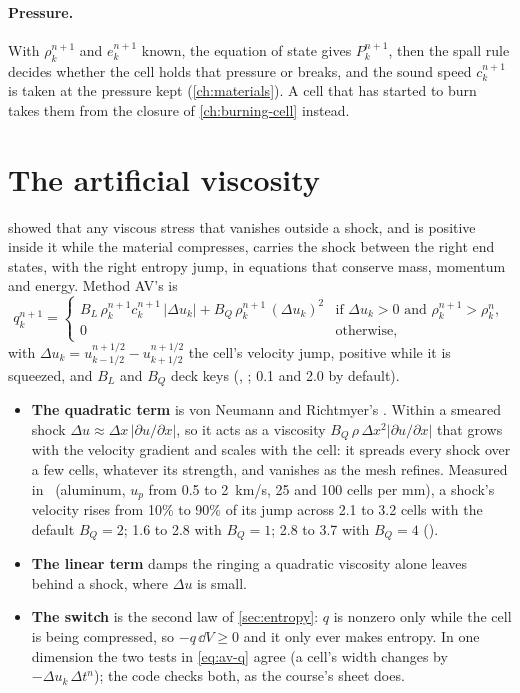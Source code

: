 \paragraph{Pressure.} With $\rho^{n+1}_k$ and $e^{n+1}_k$ known, the
equation of state gives $P^{n+1}_k$, then the spall rule decides whether
the cell holds that pressure or breaks, and the sound speed $c^{n+1}_k$ is
taken at the pressure kept (\cref{ch:materials}). A cell that has started to
burn takes them from the closure of \cref{ch:burning-cell} instead.

\section{The artificial viscosity}
\label{sec:av-q}

 showed that any viscous stress that vanishes
outside a shock, and is positive inside it while the material compresses,
carries the shock between the right end states, with the right entropy
jump, in equations that conserve mass, momentum and energy. Method AV's
is
\begin{equation}
q^{n+1}_k =
\begin{cases}
B_L\,\rho^{n+1}_k c^{n+1}_k\,|\Delta u_k| + B_Q\,\rho^{n+1}_k\,(\Delta u_k)^2
  & \text{if } \Delta u_k > 0 \text{ and } \rho^{n+1}_k > \rho^n_k, \\
0 & \text{otherwise,}
\end{cases}
\label{eq:av-q}
\end{equation}
with $\Delta u_k = u^{n+1/2}_{k-1/2} - u^{n+1/2}_{k+1/2}$ the cell's
velocity jump, positive while it is squeezed, and $B_L$ and $B_Q$ deck keys
(, ; 0.1 and 2.0 by default).

\begin{itemize}
\item \textbf{The quadratic term} is von Neumann and Richtmyer's
  \cite{vonneumann1950}. Within a
  smeared shock $\Delta u \approx \Delta x\,|\partial u/\partial x|$, so it
  acts as a viscosity $B_Q\,\rho\,\Delta x^2|\partial u/\partial x|$ that
  grows with the velocity gradient and scales with the cell: it spreads
  every shock over a few cells, whatever its strength, and vanishes as the
  mesh refines. Measured in \bw\ (aluminum, $u_p$ from 0.5 to 2~km/s, 25 and
  100 cells per mm), a shock's velocity rises from 10\% to 90\% of its jump
  across 2.1 to 3.2 cells with the default $B_Q = 2$; 1.6 to 2.8 with $B_Q =
  1$; 2.8 to 3.7 with $B_Q = 4$ ().
\item \textbf{The linear term} damps the ringing a quadratic viscosity
  alone leaves behind a shock, where $\Delta u$ is small.
\item \textbf{The switch} is the second law of \cref{sec:entropy}: $q$ is
  nonzero only while the cell is being compressed, so $-q\,\dd V \ge 0$
  and it only ever makes entropy. In one dimension the two tests in
  \cref{eq:av-q} agree (a cell's width changes by $-\Delta u_k\,\Delta t^n$);
  the code checks both, as the course's sheet does.
\end{itemize}

